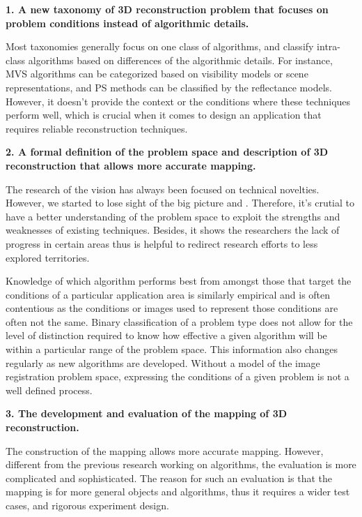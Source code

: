 \noindent\textbf{1. A new taxonomy of 3D reconstruction problem that focuses on problem conditions instead of algorithmic details.}

Most taxonomies generally focus on one class of algorithms, and classify intra-class algorithms based on differences of the algorithmic details. For instance, MVS algorithms can be categorized based on visibility models or scene representations, and PS methods can be classified by the reflectance models. However, it doesn't provide the context or the conditions where these techniques perform well, which is crucial when it comes to design an application that requires reliable reconstruction techniques.

\noindent\textbf{2. A formal definition of the problem space and description of 3D reconstruction that allows more accurate mapping.}

The research of the vision has always been focused on technical novelties. However, we started to lose sight of the big picture and . Therefore, it's crutial to have a better understanding of the problem space to exploit the strengths and weaknesses of existing techniques. Besides, it shows the researchers the lack of progress in certain areas thus is helpful to redirect research efforts to less explored territories.

Knowledge of which algorithm performs best from amongst those that target the conditions of a particular application area is similarly empirical and is often contentious as the conditions or images used to represent those conditions are often not the same. Binary classification of a problem type does not allow for the level of distinction required to know how effective a given algorithm will be within a particular range of the problem space. This information also changes regularly as new algorithms are developed. Without a model of the image registration problem space, expressing the conditions of a given problem is not a well defined process.

\noindent\textbf{3. The development and evaluation of the mapping of 3D reconstruction.}

The construction of the mapping allows more accurate mapping. However, different from the previous research working on algorithms, the evaluation is more complicated and sophisticated. The reason for such an evaluation is that the mapping is for more general objects and algorithms, thus it requires a wider test cases, and rigorous experiment design. 

